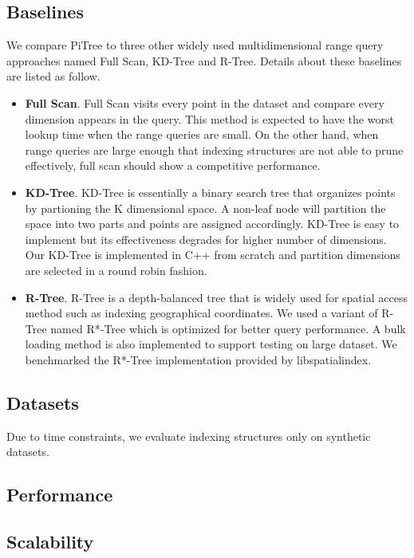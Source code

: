 \documentclass[sigconf,10pt]{acmart}
\begin{document}
\subsection{Baselines}

We compare PiTree to three other widely used multidimensional range query approaches 
named Full Scan, KD-Tree and R-Tree. Details about these baselines are listed 
as follow. 
\begin{itemize}
    \item \textbf{Full Scan}. Full Scan visits every point in the dataset and 
    compare every dimension appears in the query. This method is expected to have 
    the worst lookup time when the range queries are small. On the other hand, 
    when range queries are large enough that indexing structures are not able to 
    prune effectively, full scan should show a competitive performance.
    \item \textbf{KD-Tree}. KD-Tree is essentially a binary search tree that organizes
    points by partioning the K dimensional space. A non-leaf node will partition 
    the space into two parts and points are assigned accordingly. KD-Tree is easy to 
    implement but its effectiveness degrades for higher number of dimensions. Our KD-Tree is
    implemented in C++ from scratch and partition dimensions are selected in a round robin fashion.
    \item \textbf{R-Tree}. R-Tree is a depth-balanced tree that is widely used for spatial
    access method such as indexing geographical coordinates. We used a variant of R-Tree named
    R*-Tree which is optimized for better query performance. A bulk loading method is also 
    implemented to support testing on large dataset. We benchmarked the R*-Tree implementation
    provided by libspatialindex. %

\end{itemize}

\subsection{Datasets}

Due to time constraints, we evaluate indexing structures only on synthetic datasets.

\subsection{Performance}

\subsection{Scalability}
\end{document}
